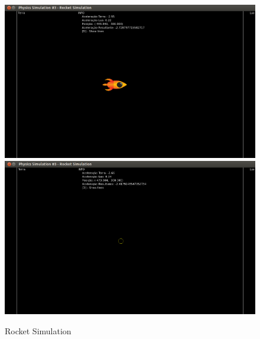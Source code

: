 \begin{figure}[H]
\centering
\caption{Rocket Simulation}
  \includegraphics[scale=0.4]{images/rocket-simulation.png}
  \includegraphics[scale=0.4]{images/rocket-simulationE.png}
\end{figure}

